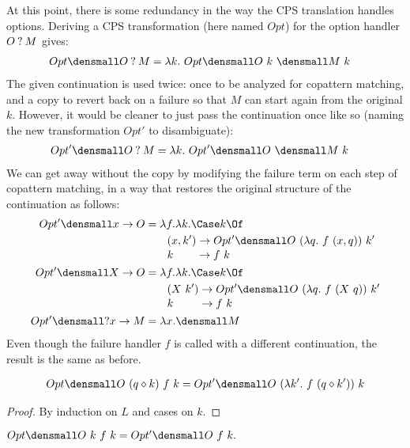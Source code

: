 \documentclass[sigplan,screen]{acmart}
\begin{document}
At this point, there is some redundancy in the way the CPS translation handles
options.  Deriving a CPS transformation (here named $Opt$) for the option
handler $O \mathbin{?} M$ gives:
\begin{align*}
  Opt\den{O \ask M} &= \lambda k.~ Opt\den{O} ~ k ~ \den{M} ~ k
\end{align*}
The given continuation is used twice: once to be analyzed for copattern
matching, and a copy to revert back on a failure so that $M$ can start again
from the original $k$.  However, it would be cleaner to just pass the
continuation once like so (naming the new transformation $Opt'$ to
disambiguate):
\begin{align*}
  Opt'\den{O \ask M} &= \lambda k.~ Opt'\den{O} ~ \den{M} ~ k
\end{align*}
We can get away without the copy by modifying the failure term on each step of
copattern matching, in a way that restores the original structure of the
continuation as follows:
\begin{align*}
  Opt'\den{x \to O}
  &=
  \lambda f. \lambda k.
  \Case k \Of
  \\
  &\qquad
  \begin{alignedat}[t]{2}
    &(x, k') &&\to Opt'\den{O} ~ (\lambda q.~ f ~ (x, q)) ~ k'
    \\[-0.5ex]
    &k &&\to f ~ k
  \end{alignedat}
  \\
  Opt'\den{X \to O}
  &=
  \lambda f. \lambda k.
  \Case k \Of
  \\
  &\qquad
  \begin{alignedat}[t]{2}
    &(X ~ k') &&\to Opt'\den{O} ~ (\lambda q.~ f ~ (X ~ q)) ~ k'
    \\[-0.5ex]
    &k &&\to f ~ k
  \end{alignedat}
  \\
  Opt'\den{\ask x \to M}
  &=
  \lambda x. \den{M}
\end{align*}
Even though the failure handler $f$ is called with a different continuation, the
result is the same as before.
\begin{lemma}
  \begin{align*}
    Opt\den{O} ~ (q \compq k) ~ f ~ k
    =
    Opt'\den{O} ~ (\lambda k'.~ f ~ (q \compq k')) ~ k
  \end{align*}
\end{lemma}
\begin{proof}
  By induction on $L$ and cases on $k$.
\end{proof}
\begin{corollary}
  \begin{math}
    Opt\den{O} ~ k ~ f ~ k
    =
    Opt'\den{O} ~ f ~ k
    .
  \end{math}
\end{corollary}
\end{document}
